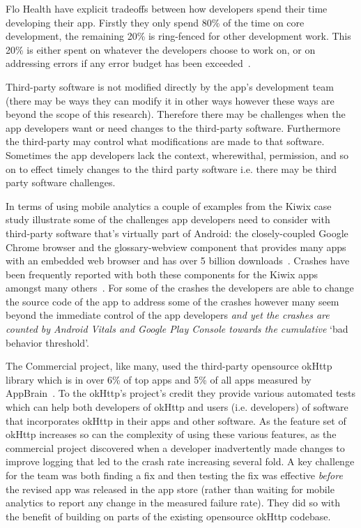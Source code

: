 Flo Health have explicit tradeoffs between how developers spend their time developing their app. Firstly they only spend 80\% of the time on core development, the remaining 20\% is ring-fenced for other development work. This 20\% is either spent on whatever the developers choose to work on, or on addressing errors if any error budget has been exceeded~.


Third-party software is not modified directly by the app's development team (there may be ways they can modify it in other ways however these ways are beyond the scope of this research). Therefore there may be challenges when the app developers want or need changes to the third-party software. Furthermore the third-party may control what modifications are made to that software. Sometimes the app developers lack the context, wherewithal, permission, and so on to effect timely changes to the third party software i.e. there may be third party software challenges.

In terms of using mobile analytics a couple of examples from the Kiwix case study illustrate some of the challenges app developers need to consider with third-party software that's virtually part of Android: the closely-coupled Google Chrome browser and the \Gls{glossary-webview} component that provides many apps with an embedded web browser and has over 5 billion downloads~. Crashes have been frequently reported with both these components for the Kiwix apps amongst many others~. For some of the crashes the developers are able to change the source code of the app to address some of the crashes however many seem beyond the immediate control of the app developers \emph{and yet the crashes are counted by Android Vitals and Google Play Console towards the cumulative} `bad behavior threshold'. 

The Commercial project, like many, used the third-party opensource okHttp library which is in over 6\% of top apps and 5\% of all apps measured by AppBrain~.
%
To the okHttp's project's credit they provide various automated tests which can help both developers of okHttp and users (i.e. developers) of software that incorporates okHttp in their apps and other software. As the feature set of okHttp increases so can the complexity of using these various features, as the commercial project discovered when a developer inadvertently made changes to improve logging that led to the crash rate increasing several fold. A key challenge for the team was both finding a fix and then testing the fix was effective \emph{before} the revised app was released in the app store (rather than waiting for mobile analytics to report any change in the measured failure rate). They did so with the benefit of building on parts of the existing opensource okHttp codebase.

